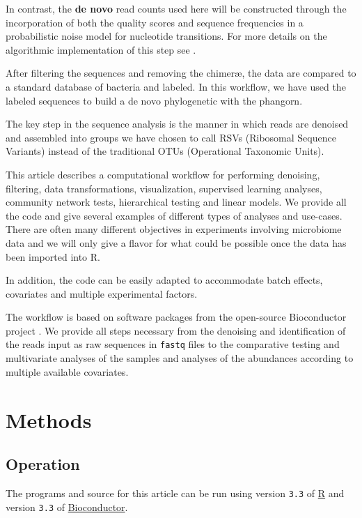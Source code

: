 \documentclass[9pt,a4paper]{extarticle}\usepackage[]{graphicx}\usepackage[]{color}
\makeatletter
\newcommand{\pkgname}[1]{\textit{#1}\xspace}
\newcommand{\CRANurl}[1]{\url{http://cran.r-project.org/package=#1}}
\def\CRANpkg{\@ifstar\@CRANpkg\@@CRANpkg}
\def\@CRANpkg#1{\href{http://cran.r-project.org/package=#1}{\pkgname{#1}}}
\def\@@CRANpkg#1{\href{http://cran.r-project.org/package=#1}{\pkgname{#1}}} %
\makeatother
\begin{document}
In contrast, the {\bf de novo} read counts used here will be
constructed through the incorporation of both the quality scores and sequence frequencies in
a probabilistic  noise model for nucleotide transitions. For more details
on the algorithmic  implementation of this
step see \cite{dada2}.

After filtering the sequences and removing the chimer\ae, the data
are compared to a standard database of bacteria and labeled.
In this workflow, we have used
the labeled sequences to build a de novo phylogenetic with the
\CRANpkg{phangorn}.

The key step in the sequence analysis is the manner in which reads are
denoised and assembled into groups we have chosen to call {RSVs (Ribosomal Sequence Variants)} instead of
the traditional {OTUs (Operational Taxonomic Units)}.

This article describes a computational workflow for performing
denoising, filtering, data transformations, visualization,
supervised learning analyses, community network tests,
hierarchical testing and linear models. We provide all the code and give
several examples of different types of analyses and use-cases.
There are often many
different objectives in experiments involving microbiome data and we
will only give a flavor for what could be possible once the data has
been imported into R.


In addition, the code can be easily adapted to accommodate batch
effects, covariates and multiple experimental factors.

The workflow is based on software packages from the open-source
Bioconductor project \citep{Huber:2015}.  We provide all steps
necessary from the denoising and identification of the reads input as
raw sequences in {\tt fastq} files to the comparative testing and multivariate
analyses of the
samples and analyses of the abundances according to multiple available
covariates.

\section*{Methods}







\subsection*{Operation}
The programs and source for this article can be run using version {\tt 3.3}
of \href{https://cran.r-project.org}{R} and version {\tt 3.3} of \href{https://www.bioconductor.org/install/}{Bioconductor}.
\end{document}
